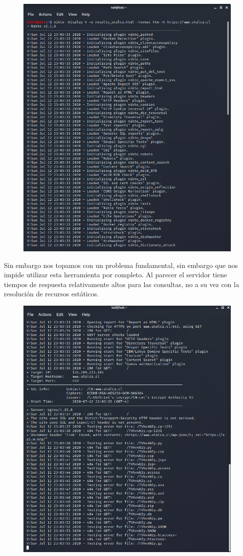 \documentclass[11pt]{utalcaDoc}
\begin{document}
\begin{figure}[H]
	\centering
	\includegraphics[width=.75\textwidth]{images2/nikto1.png}
\end{figure}


Sin embargo nos topamos con un problema fundamental, sin embargo que nos impide utilizar esta herramienta por completo. Al parecer el servidor tiene tiempos de respuesta relativamente altos para las consultas, no a su vez con la resolución de recursos estáticos. 


\begin{figure}[H]
	\centering
	\includegraphics[width=.75\textwidth]{images2/nikto2.png}
\end{figure}
\end{document}
